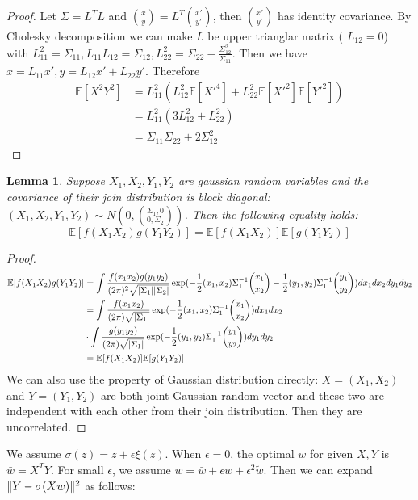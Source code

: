 \documentclass{article}
\DeclarePairedDelimiter\abs{\lvert}{\rvert}
\DeclarePairedDelimiter\norm{\lVert}{\rVert}
\def\E{\mathbb{E}}
\newtheorem{lemma}{Lemma}
\begin{document}
\begin{proof}
Let $\Sigma = L^T L $ and $\binom{x}{y} = L^T \binom{x'}{y'}$, then $\binom{x'}{y'}$ has identity covariance. By Cholesky decomposition we can make $L$ be upper trianglar matrix (
$L_{12}=0$) with $L_{11}^2 = \Sigma_{11}, L_{11}L_{12} = \Sigma_{12}, L_{22}^2 = \Sigma_{22} - \frac{\Sigma_{12}^2}{\Sigma_{11}}$. Then we have $x = L_{11} x', y = L_{12} x' + L_{22} y'$. Therefore
\begin{align*}
\E[X^2 Y^2] & = L_{11}^2 (L_{12}^2\E[X'^4]+ L^2_{22}\E[X'^2]\E[Y'^2]) \\
& = L_{11}^2(3L_{12}^2 + L^2_{22}) \\
& = \Sigma_{11}\Sigma_{22} + 2\Sigma_{12}^2
\end{align*}
\end{proof}
\begin{lemma}\label{lem:abcd}
Suppose $X_1, X_2, Y_1, Y_2$ are gaussian random variables and the covariance of their join distribution is block diagonal:
$(X_1, X_2, Y_1, Y_2) \sim N(0, \binom{\Sigma_1, 0}{0, \Sigma_2})$. Then the following equality holds:
\begin{equation}
\E[f(X_1X_2)g(Y_1Y_2)] = \E[f(X_1 X_2)] \E[g(Y_1 Y_2)]
\end{equation}
\end{lemma}
\begin{proof}
\begin{align*}
\E[f(X_1X_2)g(Y_1Y_2)] & = \int \frac{f(x_1 x_2) g(y_1 y_2) }{(2\pi)^2 \sqrt{\abs{\Sigma_1}\abs{\Sigma_2}}}\exp(-\frac{1}{2}(x_1, x_2) \Sigma_1^{-1} \binom{x_1}{x_2}-\frac{1}{2}(y_1, y_2) \Sigma_1^{-1} \binom{y_1}{y_2})dx_1 d x_2 dy_1 dy_2 \\
& = \int \frac{f(x_1 x_2)  }{(2\pi) \sqrt{\abs{\Sigma_1}}}\exp(-\frac{1}{2}(x_1, x_2) \Sigma_1^{-1} \binom{x_1}{x_2})dx_1 d x_2  \\
&\cdot  \int \frac{ g(y_1 y_2)  }{(2\pi) \sqrt{\abs{\Sigma_1}}}\exp(-\frac{1}{2}(y_1, y_2) \Sigma_1^{-1} \binom{y_1}{y_2})dy_1 d y_2 \\
& = \E[f(X_1 X_2)] \E[g(Y_1 Y_2)]
\end{align*}
We can also use the property of Gaussian distribution directly: $X=(X_1, X_2)$ and $Y=(Y_1, Y_2)$ are both joint Gaussian random vector and these two are independent with each other from their join distribution. Then they are uncorrelated.
\end{proof}
We assume $\sigma(z) = z + \epsilon \xi(z)$. When $\epsilon = 0$, the optimal $w$ for given $X, Y$ is 
$\bar{w} = X^T Y $. For small $\epsilon$, we assume $ w = \bar{w} + \epsilon \hat{w} + \epsilon^2 \tilde{w}$. Then we can expand $\norm{Y - \sigma (X w ) }^2$ as follows:
\end{document}
